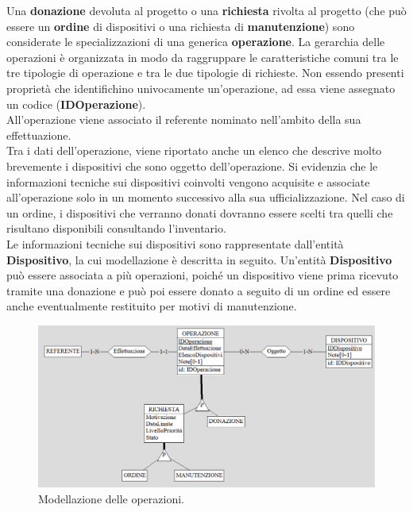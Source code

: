 \documentclass[a4paper,12pt]{report}
\begin{document}
\noindent Una \textbf{donazione} devoluta al progetto o una \textbf{richiesta} rivolta al progetto (che può essere un \textbf{ordine} di dispositivi o una richiesta di \textbf{manutenzione}) sono considerate le specializzazioni di una generica \textbf{operazione}. La gerarchia delle operazioni è organizzata in modo da raggruppare le caratteristiche comuni tra le tre tipologie di operazione e tra le due tipologie di richieste. Non essendo presenti proprietà che identifichino univocamente un'operazione, ad essa viene assegnato un codice (\textbf{IDOperazione}). \\
All'operazione viene associato il referente nominato nell'ambito della sua effettuazione. \\
Tra i dati dell'operazione, viene riportato anche un elenco che descrive molto brevemente i dispositivi che sono oggetto dell'operazione. Si evidenzia che le informazioni tecniche sui dispositivi coinvolti vengono acquisite e associate all'operazione solo in un momento successivo alla sua ufficializzazione. Nel caso di un ordine, i dispositivi che verranno donati dovranno essere scelti tra quelli che risultano disponibili consultando l'inventario. \\
Le informazioni tecniche sui dispositivi sono rappresentate dall'entità \textbf{Dispositivo}, la cui modellazione è descritta in seguito. Un'entità \textbf{Dispositivo} può essere associata a più operazioni, poiché un dispositivo viene prima ricevuto tramite una donazione e può poi essere donato a seguito di un ordine ed essere anche eventualmente restituito per motivi di manutenzione.

\begin{figure}[H]
	\centering
	\includegraphics[width=\textwidth]{images/operazione.png}
    \caption{Modellazione delle operazioni.}
	\label{images:operazione}
\end{figure}
\end{document}
